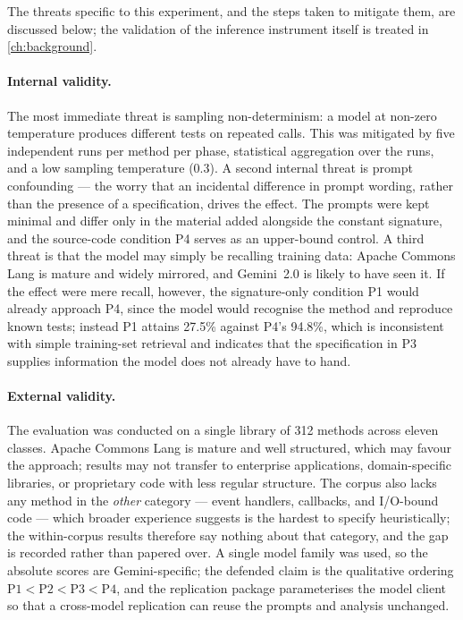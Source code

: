 The threats specific to this experiment, and the steps taken to mitigate them,
are discussed below; the validation of the inference instrument itself is treated
in \cref{ch:background}.

\paragraph{Internal validity.} The most immediate threat is sampling
non-determinism: a model at non-zero temperature produces different tests on
repeated calls. This was mitigated by five independent runs per method per phase,
statistical aggregation over the runs, and a low sampling temperature (0.3). A
second internal threat is prompt confounding --- the worry that an incidental
difference in prompt wording, rather than the presence of a specification, drives
the effect. The prompts were kept minimal and differ only in the material added
alongside the constant signature, and the source-code condition P4 serves as an
upper-bound control. A third threat is that the model may simply be recalling
training data: Apache Commons Lang is mature and widely mirrored, and Gemini~2.0
is likely to have seen it. If the effect were mere recall, however, the
signature-only condition P1 would already approach P4, since the model would
recognise the method and reproduce known tests; instead P1 attains 27.5\% against
P4's 94.8\%, which is inconsistent with simple training-set retrieval and
indicates that the specification in P3 supplies information the model does not
already have to hand.

\paragraph{External validity.} The evaluation was conducted on a single library of
312 methods across eleven classes. Apache Commons Lang is mature and well
structured, which may favour the approach; results may not transfer to enterprise
applications, domain-specific libraries, or proprietary code with less regular
structure. The corpus also lacks any method in the \emph{other} category --- event
handlers, callbacks, and I/O-bound code --- which broader experience suggests is
the hardest to specify heuristically; the within-corpus results therefore say
nothing about that category, and the gap is recorded rather than papered over.
A single model family was used, so the absolute scores are Gemini-specific; the
defended claim is the qualitative ordering $\text{P1} < \text{P2} < \text{P3} <
\text{P4}$, and the replication package parameterises the model client so that a
cross-model replication can reuse the prompts and analysis unchanged.

